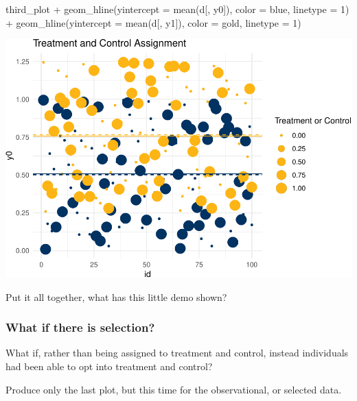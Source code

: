 \documentclass[
]{article}
\newenvironment{Shaded}{\begin{snugshade}}{\end{snugshade}}
\newcommand{\AttributeTok}[1]{\textcolor[rgb]{0.77,0.63,0.00}{#1}}
\newcommand{\DecValTok}[1]{\textcolor[rgb]{0.00,0.00,0.81}{#1}}
\newcommand{\FunctionTok}[1]{\textcolor[rgb]{0.00,0.00,0.00}{#1}}
\newcommand{\NormalTok}[1]{#1}
\newcommand{\SpecialCharTok}[1]{\textcolor[rgb]{0.00,0.00,0.00}{#1}}
\begin{document}
\begin{Shaded}
\begin{Highlighting}[]
\NormalTok{third\_plot }\SpecialCharTok{+} 
  \FunctionTok{geom\_hline}\NormalTok{(}\AttributeTok{yintercept =} \FunctionTok{mean}\NormalTok{(d[, y0]), }\AttributeTok{color =}\NormalTok{ blue, }\AttributeTok{linetype =} \DecValTok{1}\NormalTok{) }\SpecialCharTok{+} 
  \FunctionTok{geom\_hline}\NormalTok{(}\AttributeTok{yintercept =} \FunctionTok{mean}\NormalTok{(d[, y1]), }\AttributeTok{color =}\NormalTok{ gold, }\AttributeTok{linetype =} \DecValTok{1}\NormalTok{)}
\end{Highlighting}
\end{Shaded}

\includegraphics{241-live-session_files/figure-latex/add population expected values-1.pdf}

Put it all together, what has this little demo shown?

\hypertarget{what-if-there-is-selection}{%
\subsubsection{What if there is selection?}\label{what-if-there-is-selection}}

What if, rather than being assigned to treatment and control, instead individuals had been able to opt into treatment and control?

Produce only the last plot, but this time for the observational, or selected data.
\end{document}

